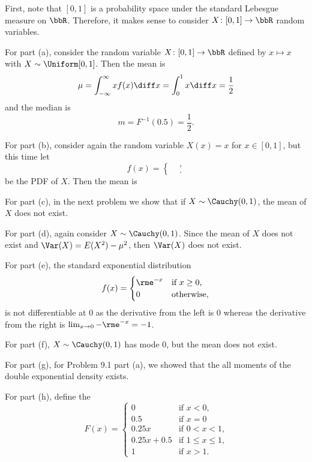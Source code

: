 \begin{solution}
  First, note that \([0,1]\) is a probability space under the standard
  Lebesgue measure on \(\bbR\). Therefore, it makes sense to consider
  \(X\colon[0,1]\to\bbR\) random variables.

  For part (a), consider the random variable \(X\colon[0,1]\to\bbR\)
  defined by \(x\mapsto x\) with \(X\sim\Uniform[0,1]\). Then the mean is
  \[
    \mu=\int_{-\infty}^\infty xf(x)\diff x=\int_0^1 x\diff x=\frac{1}{2}
  \]
  and the median is
  \[
    m=F^{-1}(0.5)=\frac{1}{2}.
  \]

  For part (b), consider again the random variable \(X(x)=x\) for
  \(x\in[0,1]\), but this time let
  \[
    f(x)=
    \begin{cases}
      &\text{},\\
      &\text{}.
    \end{cases}
  \]
  be the PDF of \(X\). Then the mean is

  For part (c), in the next problem we show that if \(X\sim\Cauchy(0,1)\),
  the mean of \(X\) does not exist.

  For part (d), again consider \(X\sim\Cauchy(0,1)\). Since the mean of
  \(X\) does not exist and \(\Var(X)=E(X^2)-\mu^2\), then \(\Var(X)\) does
  not exist.

  For part (e), the standard exponential distribution
  \[
    f(x)=
    \begin{cases}
      \rme^{-x}&\text{if \(x\geq 0\),}\\
      0&\text{otherwise,}
    \end{cases}
  \]
  is not differentiable at \(0\) as the derivative from the left is \(0\)
  whereas the derivative from the right is \(\lim_{x\to 0}-\rme^{-x}=-1\).

  For part (f), \(X\sim\Cauchy(0,1)\) has mode \(0\), but the mean does not
  exist.

  For part (g), for Problem 9.1 part (a), we showed that the all moments of
  the double exponential density exists.

  For part (h), define the
  \[
    F(x)=
    \begin{cases}
      0&\text{if \(x<0\),}\\
      0.5&\text{if \(x=0\)}\\
      0.25x&\text{if \(0<x<1\),}\\
      0.25x+0.5&\text{if \(1\leq x\leq 1\),}\\
      1&\text{if \(x>1\).}
    \end{cases}
  \]
\end{solution}
\newpage

